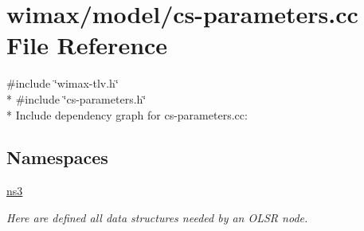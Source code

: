 \hypertarget{cs-parameters_8cc}{}\section{wimax/model/cs-\/parameters.cc File Reference}
\label{cs-parameters_8cc}
{\ttfamily \#include \char`\"{}wimax-\/tlv.\+h\char`\"{}}\\*
{\ttfamily \#include \char`\"{}cs-\/parameters.\+h\char`\"{}}\\*
Include dependency graph for cs-\/parameters.cc\+:
\subsection*{Namespaces}
\begin{DoxyCompactItemize}
\item 
 \hyperlink{namespacens3}{ns3}
\begin{DoxyCompactList}\small\item\em Here are defined all data structures needed by an O\+L\+SR node. \end{DoxyCompactList}\end{DoxyCompactItemize}
